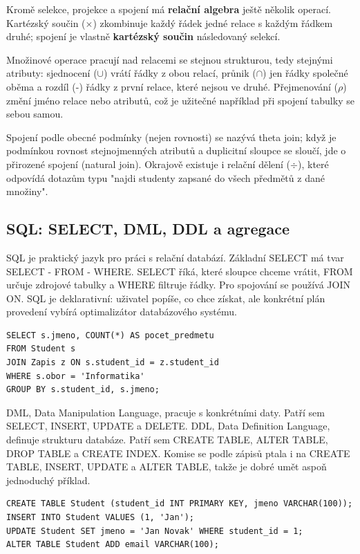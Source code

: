 Kromě selekce, projekce a spojení má \textbf{relační algebra} ještě několik operací. Kartézský součin ($\times$) zkombinuje každý řádek jedné relace s každým řádkem druhé; spojení je vlastně \textbf{kartézský součin} následovaný selekcí.

Množinové operace pracují nad relacemi se stejnou strukturou, tedy stejnými atributy: sjednocení ($\cup$) vrátí řádky z obou relací, průnik ($\cap$) jen řádky společné oběma a rozdíl (-) řádky z první relace, které nejsou ve druhé. Přejmenování ($\rho$) změní jméno relace nebo atributů, což je užitečné například při spojení tabulky se sebou samou.

Spojení podle obecné podmínky (nejen rovnosti) se nazývá theta join; když je podmínkou rovnost stejnojmenných atributů a duplicitní sloupce se sloučí, jde o přirozené spojení (natural join). Okrajově existuje i relační dělení ($\div$), které odpovídá dotazům typu "najdi studenty zapsané do všech předmětů z dané množiny".

\subsection*{SQL: SELECT, DML, DDL a agregace}

SQL je praktický jazyk pro práci s relační databází. Základní SELECT má tvar SELECT - FROM - WHERE. SELECT říká, které sloupce chceme vrátit, FROM určuje zdrojové tabulky a WHERE filtruje řádky. Pro spojování se používá JOIN ON. SQL je deklarativní: uživatel popíše, co chce získat, ale konkrétní plán provedení vybírá optimalizátor databázového systému.

\begin{codebox}
\small
\begin{verbatim}
SELECT s.jmeno, COUNT(*) AS pocet_predmetu
FROM Student s
JOIN Zapis z ON s.student_id = z.student_id
WHERE s.obor = 'Informatika'
GROUP BY s.student_id, s.jmeno;
\end{verbatim}
\end{codebox}

DML, Data Manipulation Language, pracuje s konkrétními daty. Patří sem SELECT, INSERT, UPDATE a DELETE. DDL, Data Definition Language, definuje strukturu databáze. Patří sem CREATE TABLE, ALTER TABLE, DROP TABLE a CREATE INDEX. Komise se podle zápisů ptala i na CREATE TABLE, INSERT, UPDATE a ALTER TABLE, takže je dobré umět aspoň jednoduchý příklad.

\begin{codebox}
\small
\begin{verbatim}
CREATE TABLE Student (student_id INT PRIMARY KEY, jmeno VARCHAR(100));
INSERT INTO Student VALUES (1, 'Jan');
UPDATE Student SET jmeno = 'Jan Novak' WHERE student_id = 1;
ALTER TABLE Student ADD email VARCHAR(100);
\end{verbatim}
\end{codebox}

